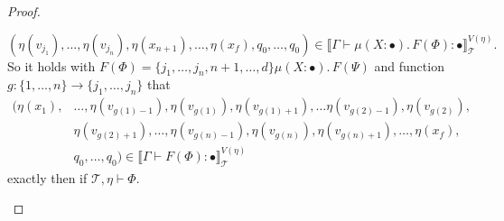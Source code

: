 \begin{proof}
\begin{compactitem}
        \[(\eta(v_{j_1}), \dots, \eta(v_{j_n}), \eta(x_{n+1}), \dots, \eta(x_f), q_0, \dots, q_0) \in \llbracket
        \Gamma \vdash \mu(X\colon \bullet).\,F(\Phi) \colon \bullet \rrbracket^{V(\eta)}_\mathcal{T}.\]
        So it holds with $F(\Phi) = \{j_1, \dots, j_n, n+1, \dots, d\} \mu (X \colon \bullet).\, F(\Psi)$ and
        function $g: \{1, \dots, n\} \rightarrow \{j_1, \dots, j_n\}$ that
        \begin{align*}
            (\eta(x_1),& \dots, \eta(v_{g(1)-1}), \eta(v_{g(1)}), \eta(v_{g(1)+1}), \dots \eta(v_{g(2)-1}), \eta
            (v_{g(2)}),\\& \eta(v_{g(2)+1}), \dots, \eta(v_{g(n)-1}), \eta(v_{g(n)}), \eta(v_{g(n)+1}), \dots, \eta
            (x_f),\\& q_0, \dots, q_0) \in \llbracket \Gamma \vdash F(\Phi) \colon \bullet \rrbracket^{V(\eta)
            }_\mathcal{T}
        \end{align*}
        exactly then if $\mathcal{T}, \eta \vdash \Phi$.


\end{compactitem}
\end{proof}
